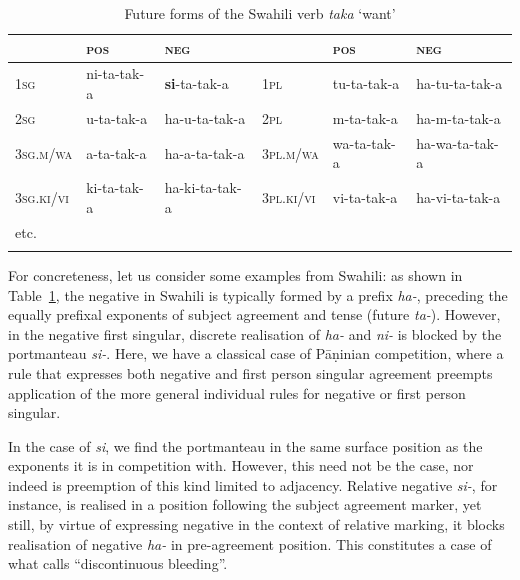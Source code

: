\documentclass[output=paper
	        ,collection
	        ,collectionchapter
 	        ,biblatex
                ,babelshorthands
                ,newtxmath
                ,draftmode
                ,colorlinks, citecolor=brown
]{langscibook}
\begin{document}
\begin{exe}
\begin{xlist}
\begin{exe}
\begin{xlist}

\begin{table}
\setlength{\tabcolsep}{.3em}
\centering
\begin{tabular}{llllll}
\lsptoprule 
 & \textsc{pos} & \textsc{neg}     &             & \textsc{pos} & \textsc{neg}\\
\midrule 
\textsc{1sg} & ni-{ta}-tak-{a} & \textbf{{si}}-{ta}-tak-{a}        & \textsc{1pl} & tu-{ta}-tak-{a}     & {ha}-tu-{ta}-tak-{a}\\
\textsc{2sg} & u-{ta}-tak-{a} & {ha}-u-{ta}-tak-{a}        & \textsc{2pl} & m-{ta}-tak-{a}      & {ha}-m-{ta}-tak-{a}\\
\textsc{3sg.m/wa} & a-{ta}-tak-{a} & {ha}-a-{ta}-tak-{a}    & \textsc{3pl.m/wa} & wa-{ta}-tak-{a} & {ha}-wa-{ta}-tak-{a}\\ 
\textsc{3sg.ki/vi} & ki-{ta}-tak-{a} & {ha}-ki-{ta}-tak-{a} & \textsc{3pl.ki/vi} & vi-{ta}-tak-{a} & {ha}-vi-{ta}-tak-{a}\\
etc. & &\\
\lspbottomrule
\end{tabular}
\caption{Future forms of the Swahili verb  \textit{taka} ‘want’}
\label{tab:SwahiliPortmanteau}
\end{table}

For concreteness, let us consider some examples from Swahili: as shown
in Table~\ref{tab:SwahiliPortmanteau}, the negative in Swahili is
typically formed by a prefix \textit{ha-}, preceding the equally
prefixal exponents of
subject agreement and tense (future \textit{ta-}). However, in the
negative first singular, discrete realisation of \textit{ha-} and
\textit{ni-} is blocked by the portmanteau \textit{si-}. Here, we have
a classical case of   Pāṇinian competition, where a rule that
expresses both negative and first person singular agreement preempts
application of the more general individual rules for negative or first
person singular.  



In the case of \textit{si}, we find the portmanteau in the same
surface position as the exponents it is in competition with.  However,
this need not be the case, nor indeed is preemption of this kind
limited to adjacency. Relative negative \textit{si-}, for instance, is
realised in a position following the subject agreement marker, yet
still, by virtue of expressing negative in the context of relative
marking, it blocks realisation of negative \textit{ha-} in
pre-agreement position. This constitutes a case of what
\citet{Noyer92} calls ``discontinuous bleeding''.


\end{xlist}
\end{exe}
\end{xlist}
\end{exe}
\end{document}
